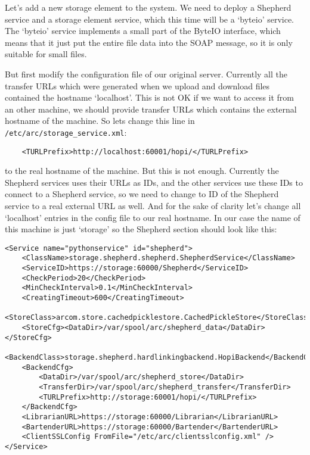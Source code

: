\documentclass{book}
\begin{document}
Let's add a new storage element to the system. We need to deploy a Shepherd service and a storage element service, which this time will be a `byteio' service. The `byteio' service implements a small part of the ByteIO interface, which means that it just put the entire file data into the SOAP message, so it is only suitable for small files.

But first modify the configuration file of our original server. Currently all the transfer URLs which were generated when we upload and download files contained the hostname `localhost'. This is not OK if we want to access it from an other machine, we should provide transfer URLs which contains the external hostname of the machine. So lets change this line in \verb!/etc/arc/storage_service.xml!:

\begin{verbatim}
    <TURLPrefix>http://localhost:60001/hopi/</TURLPrefix>
\end{verbatim}

to the real hostname of the machine. But this is not enough. Currently the Shepherd services uses their URLs as IDs, and the other services use these IDs to connect to a Shepherd service, so we need to change to ID of the Shepherd service to a real external URL as well. And for the sake of clarity let's change all `localhost' entries in the config file to our real hostname. In our case the name of this machine is just `storage' so the Shepherd section should look like this:

\begin{verbatim}
<Service name="pythonservice" id="shepherd">
    <ClassName>storage.shepherd.shepherd.ShepherdService</ClassName>
    <ServiceID>https://storage:60000/Shepherd</ServiceID>
    <CheckPeriod>20</CheckPeriod>
    <MinCheckInterval>0.1</MinCheckInterval>
    <CreatingTimeout>600</CreatingTimeout>
    <StoreClass>arcom.store.cachedpicklestore.CachedPickleStore</StoreClass>
    <StoreCfg><DataDir>/var/spool/arc/shepherd_data</DataDir></StoreCfg>
    <BackendClass>storage.shepherd.hardlinkingbackend.HopiBackend</BackendClass>
    <BackendCfg>
        <DataDir>/var/spool/arc/shepherd_store</DataDir>
        <TransferDir>/var/spool/arc/shepherd_transfer</TransferDir>
        <TURLPrefix>http://storage:60001/hopi/</TURLPrefix>
    </BackendCfg>
    <LibrarianURL>https://storage:60000/Librarian</LibrarianURL>
    <BartenderURL>https://storage:60000/Bartender</BartenderURL>
    <ClientSSLConfig FromFile="/etc/arc/clientsslconfig.xml" />
</Service>
\end{verbatim}
\end{document}
